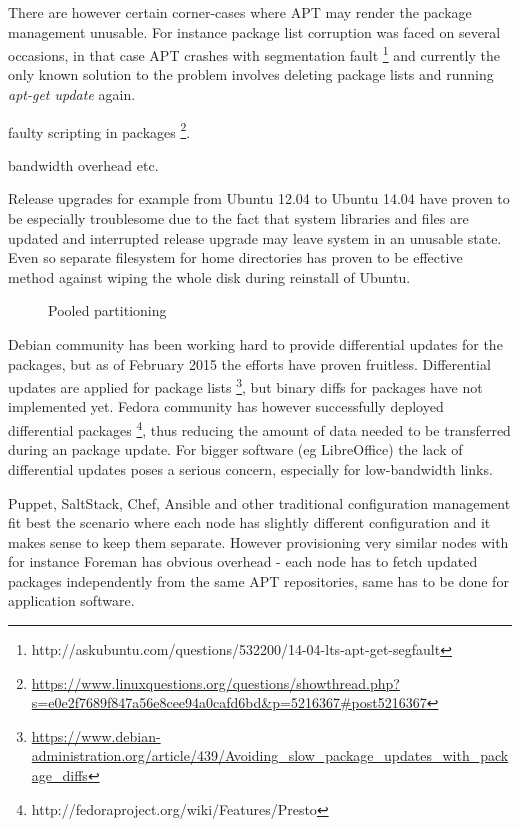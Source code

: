 \documentclass{article}
\begin{document}
There are however certain corner-cases where APT may render
the package management unusable.
For instance package list corruption was faced on several occasions,
in that case APT crashes with segmentation fault
\footnote{http://askubuntu.com/questions/532200/14-04-lts-apt-get-segfault}
and currently the only known solution to the problem
involves deleting package lists and running \emph{apt-get update} again.


faulty scripting in packages
\footnote{\url{https://www.linuxquestions.org/questions/showthread.php?s=e0e2f7689f847a56e8cee94a0cafd6bd&p=5216367#post5216367}}.

bandwidth overhead etc.


Release upgrades for example from Ubuntu 12.04 to Ubuntu 14.04
have proven to be especially troublesome due to the fact that system libraries
and files are updated and interrupted release upgrade may leave system
in an unusable state.
Even so separate filesystem for home directories has
proven to be effective method against wiping the whole disk
during reinstall of Ubuntu.


\begin{figure}[!htb]
\centering
\scalebox{0.5}{}
\caption{Pooled partitioning}
\label{fig:pooled-partitioning}
\end{figure}


Debian community has been working hard to provide differential updates for
the packages, but as of February 2015 the efforts have proven fruitless.
Differential updates are applied for package lists
\footnote{\url{https://www.debian-administration.org/article/439/Avoiding_slow_package_updates_with_package_diffs}},
but binary diffs for packages have not implemented yet.
Fedora community has however successfully deployed differential packages
\footnote{http://fedoraproject.org/wiki/Features/Presto},
thus reducing the amount of data needed to be transferred during an package update. For bigger software (eg LibreOffice) the lack of differential updates poses a serious concern, especially for low-bandwidth links.

Puppet, SaltStack, Chef, Ansible and other traditional configuration
management fit best the scenario where each node has slightly different
configuration and it makes sense to keep them separate. However
provisioning very similar nodes with for instance Foreman has obvious
overhead - each node has to fetch updated packages independently from
the same APT repositories, same has to be done for application software.
\end{document}
